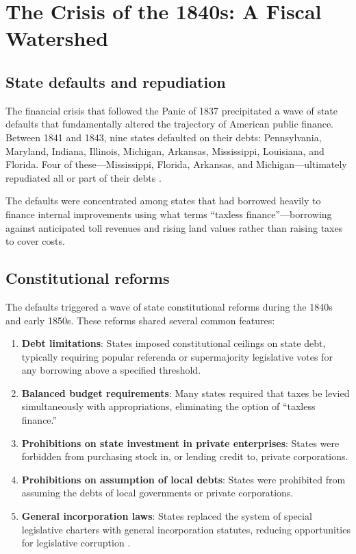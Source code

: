 \documentclass[12pt]{article}
\begin{document}
\section{The Crisis of the 1840s: A Fiscal Watershed}

\subsection{State defaults and repudiation}

The financial crisis that followed the Panic of 1837 precipitated a wave of state defaults that fundamentally altered the trajectory of American public finance.  Between 1841 and 1843, nine states defaulted on their debts: Pennsylvania, Maryland, Indiana, Illinois, Michigan, Arkansas, Mississippi, Louisiana, and Florida.  Four of these---Mississippi, Florida, Arkansas, and Michigan---ultimately repudiated all or part of their debts \citep{wallis2004sovereign, grinath1997debt}.

The defaults were concentrated among states that had borrowed heavily to finance internal improvements using what \citet{wallis2005constitutions} terms ``taxless finance''---borrowing against anticipated toll revenues and rising land values rather than raising taxes to cover costs.

\subsection{Constitutional reforms}

The defaults triggered a wave of state constitutional reforms during the 1840s and early 1850s.  These reforms shared several common features:

\begin{enumerate}
    \item \textbf{Debt limitations}: States imposed constitutional ceilings on state debt, typically requiring popular referenda or supermajority legislative votes for any borrowing above a specified threshold.

    \item \textbf{Balanced budget requirements}: Many states required that taxes be levied simultaneously with appropriations, eliminating the option of ``taxless finance.''

    \item \textbf{Prohibitions on state investment in private enterprises}: States were forbidden from purchasing stock in, or lending credit to, private corporations.

    \item \textbf{Prohibitions on assumption of local debts}: States were prohibited from assuming the debts of local governments or private corporations.

    \item \textbf{General incorporation laws}: States replaced the system of special legislative charters with general incorporation statutes, reducing opportunities for legislative corruption \citep{wallis2005constitutions}.
\end{enumerate}
\end{document}
